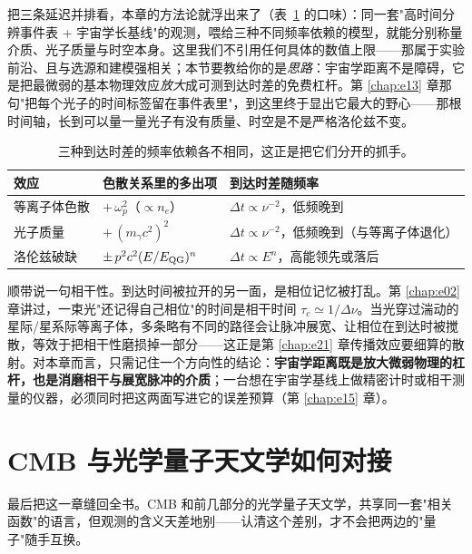把三条延迟并排看，本章的方法论就浮出来了（表~\ref{tab:e23-delays} 的口味）：同一套"高时间分辨事件表 + 宇宙学长基线"的观测，喂给三种不同频率依赖的模型，就能分别称量介质、光子质量与时空本身。这里我们不引用任何具体的数值上限——那属于实验前沿、且与选源和建模强相关；本节要教给你的是\emph{思路}：宇宙学距离不是障碍，它是把最微弱的基本物理效应\emph{放大}成可测到达时差的免费杠杆。第 \ref{chap:e13} 章那句"把每个光子的时间标签留在事件表里"，到这里终于显出它最大的野心——那根时间轴，长到可以量一量光子有没有质量、时空是不是严格洛伦兹不变。

\begin{table}[tbp]
\centering
\caption{三种到达时差的频率依赖各不相同，这正是把它们分开的抓手。}
\label{tab:e23-delays}
\begin{tabular}{@{}lll@{}}
\toprule
效应 & 色散关系里的多出项 & 到达时差随频率\\
\midrule
等离子体色散 & \(+\,\omega_p^2\)（\(\propto n_e\)） & \(\Delta t\propto \nu^{-2}\)，低频晚到\\
光子质量 & \(+\,(m_\gamma c^2)^2\) & \(\Delta t\propto \nu^{-2}\)，低频晚到（与等离子体退化）\\
洛伦兹破缺 & \(\pm\,p^2c^2(E/E_{\rm QG})^n\) & \(\Delta t\propto E^{n}\)，高能领先或落后\\
\bottomrule
\end{tabular}
\end{table}

顺带说一句相干性。到达时间被拉开的另一面，是相位记忆被打乱。第 \ref{chap:e02} 章讲过，一束光"还记得自己相位"的时间是相干时间 \(\tau_c\simeq1/\Delta\nu\)。当光穿过湍动的星际/星系际等离子体，多条略有不同的路径会让脉冲展宽、让相位在到达时被搅散，等效于把相干性磨损掉一部分——这正是第 \ref{chap:e21} 章传播效应要细算的散射。对本章而言，只需记住一个方向性的结论：\textbf{宇宙学距离既是放大微弱物理的杠杆，也是消磨相干与展宽脉冲的介质}；一台想在宇宙学基线上做精密计时或相干测量的仪器，必须同时把这两面写进它的误差预算（第 \ref{chap:e15} 章）。

\section{CMB 与光学量子天文学如何对接}
\label{sec:e23-bridge}

最后把这一章缝回全书。CMB 和前几部分的光学量子天文学，共享同一套"相关函数"的语言，但观测的含义天差地别——认清这个差别，才不会把两边的"量子"随手互换。

